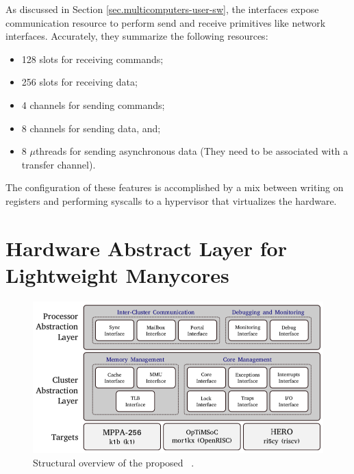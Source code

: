 		As discussed in Section \ref{sec.multicomputers-user-sw}, the \noc interfaces
		expose communication resource to perform send and receive primitives
		like network interfaces.
		Accurately, they summarize the following resources:

		\begin{itemize}
			\item 128 slots for receiving commands;
			\item 256 slots for receiving data;
			\item 4 channels for sending commands;
			\item 8 channels for sending data, and;
			\item 8 $\mu$threads for sending asynchronous data
				(They need to be associated with a transfer channel).
		\end{itemize}

		The configuration of these features is accomplished by a mix between
		writing on \dma registers and performing syscalls to a hypervisor
		that virtualizes the \mppa hardware.	

\section{Hardware Abstract Layer for Lightweight Manycores}
\label{sec.hal}


	\begin{figure}[h]
		\centering
		\includegraphics[width=.9\textwidth]{images/hal-struct.png}

		\caption{
			Structural overview of the proposed \hal~\cite{penna:compas2019}.
		}\par
		\label{fig.hal-struct}
	\end{figure}
	
